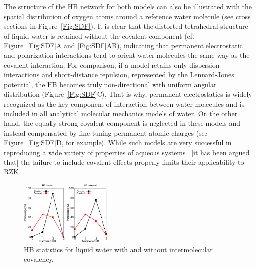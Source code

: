 \documentclass[aps,prl,reprint,amsmath,amssymb]{revtex4-1}
\begin{document}
The structure of the HB network for both models can also be illustrated with the spatial distribution of oxygen atoms around a reference water molecule (see cross sections in Figure~\ref{Fig:SDF}). 
It is clear that the distorted tetrahedral structure of liquid water is retained without the covalent component (cf. Figure~\ref{Fig:SDF}A and \ref{Fig:SDF}AB), indicating that permanent electrostatic and polarization interactions tend to orient water molecules the same way as the covalent interaction. 
For comparison, if a model retains only dispersion interactions and short-distance repulsion, represented by the Lennard-Jones potential, the HB becomes truly non-directional with uniform angular distribution (Figure~\ref{Fig:SDF}C). 
That is why, permanent electrostatics is widely recognized as the key component of interaction between water molecules and is included in all analytical molecular mechanics models of water. 
On the other hand, the equally strong covalent component is neglected in these models and instead compensated by fine-tuning permanent atomic charges (see Figure~\ref{Fig:SDF}D, for example). 
While such models are very successful in reproducing a wide variety of properties of aqueous systems~\cite{RZK-Vega2011} [it has been argued that] the failure to include covalent effects properly limits their applicability to RZK~\cite{RZK0-weinhold}. %


\begin{figure}
\includegraphics[width=0.4\textwidth]{new_hbstat}
\caption{HB statistics for liquid water with and without intermolecular covalency.}\label{fig:HBstat}
\end{figure}
\end{document}
